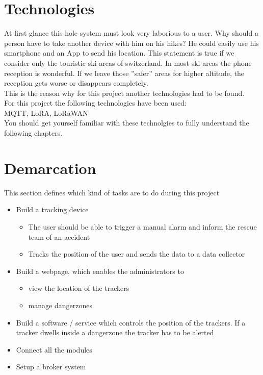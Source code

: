 \documentclass[a4paper,11pt, oneside]{report}
\theoremstyle{definition}
\begin{document}
\newpage

\section{Technologies}
At first glance this hole system must look very laborious  to a user. Why should a person have to take another device with him on his hikes? He could easily use his smartphone and an App to send his location. This statement is true if we consider only the touristic ski areas of switzerland. In most  ski areas the phone reception is wonderful. If we leave those ''safer'' areas for higher altitude, the reception gets worse or disappears completely. \\[0.3cm]
This is the reason why for this project another technologies had to be found.\\[0.3cm]
For this project the following technologies have been used:\\
MQTT, LoRA, LoRaWAN\\[0.3cm]
You should get yourself familiar with these technolgies to fully understand the following chapters.

\section{Demarcation}
This section defines which kind of tasks are to do during this project
\begin{itemize}
\item Build a tracking device
	\begin{itemize}
		\item
			The user should be able to trigger a manual alarm and inform the rescue team of an accident
		\item
			Tracks the position of the user and sends the data to a data collector
	\end{itemize}
\item Build a webpage, which enables the administrators to
	\begin{itemize}
		\item
			view the location of the trackers
		\item
			manage dangerzones
	\end{itemize}
\item Build a software / service which controls the position of the trackers. If a tracker dwells inside a dangerzone the tracker has to be alerted
\item Connect all the modules
\item Setup a broker system
\end{itemize}
\end{document}
